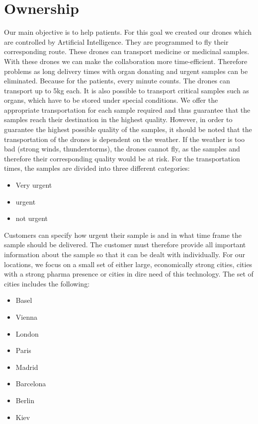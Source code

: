\chapter{Ownership} \label{ownership}
Our main objective is to help patients. For this goal we created our drones which are controlled by Artificial Intelligence. They are programmed to fly their corresponding route. These drones can transport medicine or medicinal samples. With these drones we can make the collaboration more time-efficient. Therefore problems as long delivery times with organ donating and urgent samples can be eliminated. Because for the patients, every minute counts. The drones can transport up to 5kg each. It is also possible to transport critical samples such as organs, which have to be stored under special conditions. We offer the appropriate transportation for each sample required and thus guarantee that the samples reach their destination in the highest quality. However, in order to guarantee the highest possible quality of the samples, it should be noted that the transportation of the drones is dependent on the weather. If the weather is too bad (strong winds, thunderstorms), the drones cannot fly, as the samples and therefore their corresponding quality would be at risk. For the transportation times, the samples are divided into three different categories:
\begin{itemize}
  \item Very urgent
  \item urgent
  \item not urgent
\end{itemize}
Customers can specify how urgent their sample is and in what time frame the sample should be delivered. The customer must therefore provide all important information about the sample so that it can be dealt with individually.
\newline
\newline
For our locations, we focus on a small set of either large, economically strong cities, cities with a strong pharma presence or cities in dire need of this technology. The set of cities includes the following:
\begin{itemize}
  \item Basel
  \item Vienna
  \item London
  \item Paris
  \item Madrid
  \item Barcelona
  \item Berlin
  \item Kiev
\end{itemize}
